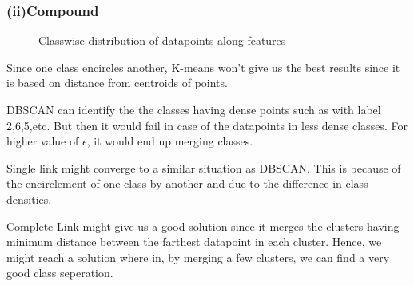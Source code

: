 \documentclass[paper=a4, fontsize=11pt]{scrartcl}
\numberwithin{equation}{section}		%
\numberwithin{figure}{section}			%
\numberwithin{table}{section}				%
\begin{document}
\subsubsection*{(ii)Compound}
\begin{figure}[H]
  \centering
  \hfill
  \caption*{Classwise distribution of datapoints along features}
\end{figure}

Since one class encircles another, K-means won't give us the best results since it is based on distance from centroids of points.

DBSCAN can identify the the classes having dense points such as with label 2,6,5,etc. But then it would fail in case of the datapoints in less dense classes. For higher value of $\epsilon$, it would end up merging classes.

Single link might converge to a similar situation as DBSCAN. This is because of the encirclement of one class by another and due to the difference in class densities.

Complete Link might give us a good solution since it merges the clusters having minimum distance between the farthest datapoint in each cluster. Hence, we might reach a solution where in, by merging a few clusters, we can find a very good class seperation.
\end{document}
